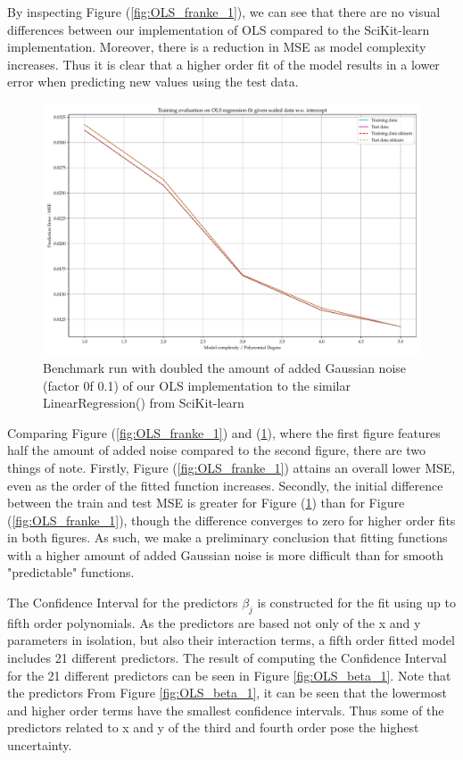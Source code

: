 \documentclass[11pt, a4paper]{article}
\begin{document}
By inspecting Figure (\ref{fig:OLS_franke_1}), we can see that there are no visual differences between our implementation of OLS compared to the SciKit-learn implementation. Moreover, there is a reduction in MSE as model complexity increases. Thus it is clear that a higher order fit of the model results in a lower error when predicting new values using the test data.

\begin{figure}
  \centering
  \includegraphics[scale=0.5]{figures/EX1_franke_function_OLS_evaluate_fit_dn.pdf}
  \caption{\label{fig:OLS_franke_2} Benchmark run with doubled the amount of added Gaussian noise (factor 0f 0.1) of our OLS implementation to the similar LinearRegression() from SciKit-learn}
\end{figure}

Comparing Figure (\ref{fig:OLS_franke_1}) and (\ref{fig:OLS_franke_2}), where the first figure features half the amount of added noise compared to the second figure, there are two things of note. Firstly, Figure (\ref{fig:OLS_franke_1}) attains an overall lower MSE, even as the order of the fitted function increases. Secondly, the initial difference between the train and test MSE is greater for Figure (\ref{fig:OLS_franke_2}) than for Figure (\ref{fig:OLS_franke_1}), though the difference converges to zero for higher order fits in both figures. As such, we make a preliminary conclusion that fitting functions with a higher amount of added Gaussian noise is more difficult than for smooth "predictable" functions. 

The Confidence Interval for the predictors $\beta_j$ is constructed for the fit using up to fifth order polynomials. As the predictors are based not only of the x and y parameters in isolation, but also their interaction terms, a fifth order fitted model includes 21 different predictors. The result of computing the Confidence Interval for the 21 different predictors can be seen in Figure \ref{fig:OLS_beta_1}. Note that the predictors  From Figure \ref{fig:OLS_beta_1}, it can be seen that the lowermost and higher order terms have the smallest confidence intervals. Thus some of the predictors related to x and y of the third and fourth order pose the highest uncertainty. 
\end{document}

